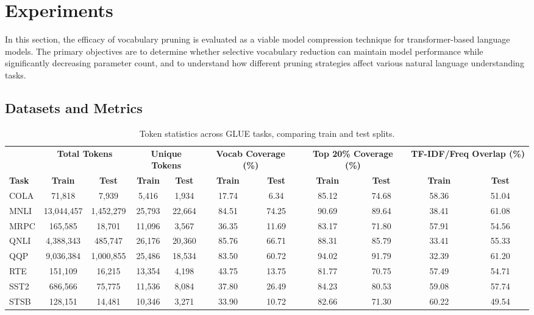 \documentclass[twocolumn]{article}
\begin{document}
\section{Experiments}
In this section, the efficacy of vocabulary pruning is evaluated as a viable model compression technique for transformer-based language models. The primary objectives are to determine whether selective vocabulary reduction can maintain model performance while significantly decreasing parameter count, and to understand how different pruning strategies affect various natural language understanding tasks. 

\subsection{Datasets and Metrics}

\begin{table}[htbp]
\centering
\scriptsize
\setlength{\tabcolsep}{3.5pt}
\begin{tabular}{l|cc|cc|cc|cc|cc}
\toprule
& \multicolumn{2}{c|}{\textbf{Total Tokens}} & \multicolumn{2}{c|}{\textbf{Unique Tokens}} & \multicolumn{2}{c|}{\textbf{Vocab Coverage (\%)}} & \multicolumn{2}{c|}{\textbf{Top 20\% Coverage (\%)}} & \multicolumn{2}{c}{\textbf{TF-IDF/Freq Overlap (\%)}} \\
\textbf{Task} & \textbf{Train} & \textbf{Test} & \textbf{Train} & \textbf{Test} & \textbf{Train} & \textbf{Test} & \textbf{Train} & \textbf{Test} & \textbf{Train} & \textbf{Test} \\
\midrule
COLA & 71,818 & 7,939 & 5,416 & 1,934 & 17.74 & 6.34 & 85.12 & 74.68 & 58.36 & 51.04 \\
MNLI & 13,044,457 & 1,452,279 & 25,793 & 22,664 & 84.51 & 74.25 & 90.69 & 89.64 & 38.41 & 61.08 \\
MRPC & 165,585 & 18,701 & 11,096 & 3,567 & 36.35 & 11.69 & 83.17 & 71.80 & 57.91 & 54.56 \\
QNLI & 4,388,343 & 485,747 & 26,176 & 20,360 & 85.76 & 66.71 & 88.31 & 85.79 & 33.41 & 55.33 \\
QQP & 9,036,384 & 1,000,855 & 25,486 & 18,534 & 83.50 & 60.72 & 94.02 & 91.79 & 32.39 & 61.20 \\
RTE & 151,109 & 16,215 & 13,354 & 4,198 & 43.75 & 13.75 & 81.77 & 70.75 & 57.49 & 54.71 \\
SST2 & 686,566 & 75,775 & 11,536 & 8,084 & 37.80 & 26.49 & 84.23 & 80.53 & 59.08 & 57.74 \\
STSB & 128,151 & 14,481 & 10,346 & 3,271 & 33.90 & 10.72 & 82.66 & 71.30 & 60.22 & 49.54 \\
\bottomrule
\end{tabular}
\caption{Token statistics across GLUE tasks, comparing train and test splits.}
\label{tab:token_statistics}
\end{table}
    
\end{document}
